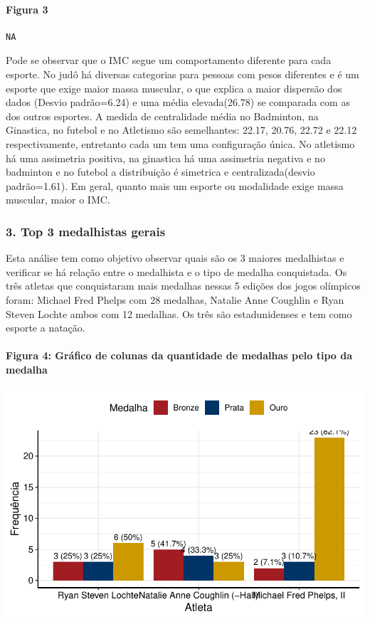 \documentclass[
  letterpaper,
  DIV=11,
  numbers=noendperiod]{scrartcl}
\let\oldparagraph\paragraph
\renewcommand{\paragraph}[1]{\oldparagraph{#1}\mbox{}}
\begin{document}
\paragraph{Figura 3}\label{figura-3}

\begin{verbatim}
NA
\end{verbatim}

Pode se observar que o IMC segue um comportamento diferente para cada
esporte. No judô há diversas categorias para pessoas com pesos
diferentes e é um esporte que exige maior massa muscular, o que explica
a maior dispersão dos dados (Desvio padrão=6.24) e uma média
elevada(26.78) se comparada com as dos outros esportes. A medida de
centralidade média no Badminton, na Ginastica, no futebol e no Atletismo
são semelhantes: 22.17, 20.76, 22.72 e 22.12 respectivamente, entretanto
cada um tem uma configuração única. No atletismo há uma assimetria
positiva, na ginastica há uma assimetria negativa e no badminton e no
futebol a distribuição é simetrica e centralizada(desvio padrão=1.61).
Em geral, quanto mais um esporte ou modalidade exige massa muscular,
maior o IMC.

\subsubsection{3. Top 3 medalhistas
gerais}\label{top-3-medalhistas-gerais}

Esta análise tem como objetivo observar quais são os 3 maiores
medalhistas e verificar se há relação entre o medalhista e o tipo de
medalha conquistada. Os três atletas que conquistaram mais medalhas
nessas 5 edições dos jogos olímpicos foram: Michael Fred Phelps com 28
medalhas, Natalie Anne Coughlin e Ryan Steven Lochte ambos com 12
medalhas. Os três são estadunidenses e tem como esporte a natação.

\paragraph{Figura 4: Gráfico de colunas da quantidade de medalhas pelo
tipo da
medalha}\label{figura-4-gruxe1fico-de-colunas-da-quantidade-de-medalhas-pelo-tipo-da-medalha}

\includegraphics{Relatorio-projeto-fantasma_files/figure-pdf/unnamed-chunk-5-1.pdf}
\end{document}

